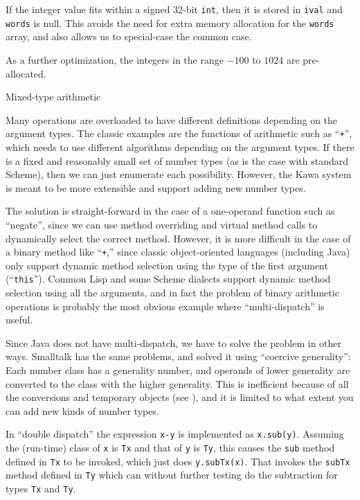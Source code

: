 \documentclass[twocolumn]{article}
\makeatletter
\def\section{\@startsection {section}{1}{\z@}
   {14pt plus 2pt minus 2pt}{12pt plus 2pt minus 2pt} {\large\bf}}
\makeatother
\begin{document}
If the integer value fits within a signed 32-bit {\tt int},
then it is stored in {\tt ival} and {\tt words} is null.
This avoids the need for extra memory allocation for the {\tt words}
array, and also allows us to special-case the common case.

As a further optimization, the integers in the range $- 100$ to $1024$
are pre-allocated.

\section{Mixed-type arithmetic}

Many operations are overloaded to have different
definitions depending on the argument types.
The classic examples are the functions of arithmetic
such as ``\verb|+|'', which needs to use different
algorithms depending on the argument types.
If there is a fixed and reasonably small set of number types
(as is the case with standard Scheme), then we can just
enumerate each possibility.  However, the Kawa system is
meant to be more extensible and support adding new
number types.

The solution is straight-forward in the case of a one-operand
function such as ``negate'', since we can use method
overriding and virtual method calls to dynamically
select the correct method.  However, it is more difficult
in the case of a binary method like ``\verb|+|,'' since
classic object-oriented languages (including Java) only
support dynamic method selection using the type of the
first argument (``{\tt this}'').  
Common Lisp and some Scheme dialects support dynamic method
selection using all the arguments, and in fact the
problem of binary arithmetic operations is probably the
most obvious example where ``multi-dispatch'' is useful.

Since Java does not have multi-dispatch, we have to solve
the problem in other ways.  Smalltalk has the same problems,
and solved it using ``coercive generality'':  Each number class
has a generality number, and operands of lower generality are
converted to the class with the higher generality.
This is inefficient because of all the conversions and
temporary objects (see \cite{Budd91Arith}), and it is limited
to what extent you can add new kinds of number types.

In ``double dispatch'' \cite{Ingalls86} the expression {\tt x-y}
is implemented as {\tt x.sub(y)}.  Assuming the (run-time)
class of {\tt x} is {\tt Tx} and that of {\tt y} is {\tt Ty},
this causes the {\tt sub} method defined in {\tt Tx} to be
invoked, which just does {\tt y.subTx(x)}.  That invokes
the {\tt subTx} method defined in {\tt Ty} which can without
further testing do the subtraction for types {\tt Tx} and {\tt Ty}.
\end{document}

